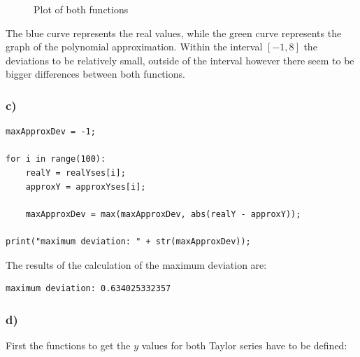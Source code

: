 \begin{figure}[h!]
\caption{Plot of both functions}
\end{figure}

The blue curve represents the real values, while the green curve represents the graph of the polynomial approximation. Within the interval $[-1, 8]$ the deviations to be relatively small, outside of the interval however there seem to be bigger differences between both functions.


\subsubsection{c)}

\begin{lstlisting}[caption=Problem 5.9 c)]
maxApproxDev = -1;

for i in range(100):
	realY = realYses[i];
	approxY = approxYses[i];
	
	maxApproxDev = max(maxApproxDev, abs(realY - approxY));

print("maximum deviation: " + str(maxApproxDev));
\end{lstlisting}


The results of the calculation of the maximum deviation are:

\begin{lstlisting}[caption=Result of 5.9 c), keywordstyle=\color{black}]
maximum deviation: 0.634025332357
\end{lstlisting}


\subsubsection{d)}

First the functions to get the $y$ values for both Taylor series have to be defined:

